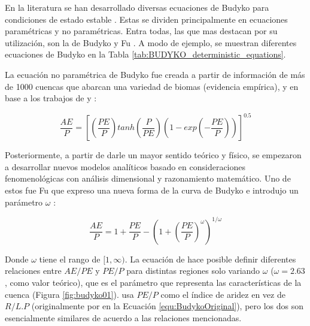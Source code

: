 \documentclass[12pt]{article}
\begin{document}
En la literatura se han desarrollado diversas ecuaciones de Budyko para condiciones de estado estable \citep{schreiber1904relationship,ol1911evaporation,turc1954water,budyko1958heat,Budyko1961,Pike1964,Fu1981,Koster1999,zhang2001response,zhou2015complementary,Wang2014,Zhang2004,Zhang2008,fathi2019new}. Estas se dividen principalmente en ecuaciones paramétricas y no paramétricas. Entra todas, las que mas destacan por su utilización, son la de Budyko \citep{budyko1958heat} y Fu \citep{Fu1981}. A modo de ejemplo, se muestran diferentes ecuaciones de Budyko en la Tabla \ref{tab:BUDYKO_deterministic_equations}.



La ecuación no paramétrica de Budyko fue creada a partir de información de más de 1000 cuencas que abarcan una variedad de biomas (evidencia empírica), y en base a los trabajos de \citet{schreiber1904relationship} y \citet{ol1911evaporation}: 

\begin{equation}
\frac{AE}{P} = \left [\left ( \frac{PE}{P} \right )tanh\left ( \frac{P}{PE} \right )(1 - exp\left ( -\frac{PE}{P} \right ))  \right ]^{0.5}
\label{equ:no_parametric_budyko_equation}
\end{equation}

Posteriormente, a partir de darle un mayor sentido teórico y físico, se empezaron a desarrollar nuevos modelos analíticos basado en consideraciones fenomenológicas con análisis dimensional y razonamiento matemático. Uno de estos fue Fu \citep{Fu1981} que expreso una nueva forma de la curva de Budyko e introdujo un parámetro $\omega$ \citep{Zhang2004}: 

\begin{equation}
\frac{AE}{P} = 1 + \frac{PE}{P} - \left (1 + \left ( \frac{PE}{P} \right )^{\omega}  \right )^{1/\omega}
\label{equ:fuEqu}
\end{equation}

Donde $\omega$ tiene el rango de $[1,\infty)$. La ecuación de \citet{Fu1981} hace posible definir diferentes relaciones entre $AE/PE$ y $PE/P$ para distintas regiones solo variando $\omega$ ($\omega = 2.63$, como valor teórico), que es el parámetro que representa las características de la cuenca (Figura \ref{fig:budyko01}). \citet{Fu1981} usa $PE/P$ como el índice de aridez en vez de $R/L.P$ (originalmente por \citet{budyko1958heat} en la Ecuación \ref{equ:BudykoOriginal}), pero los dos son esencialmente similares de acuerdo a las relaciones mencionadas.
\end{document}
